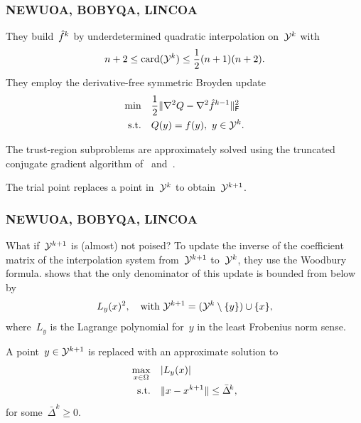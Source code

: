 \documentclass{polyu-presentation}
\newcommand{\objm}[1][]{\hat{f}\ifthenelse{\equal{#1}{}}{}{^{#1}}}
\newcommand{\xpt}[1][]{\mathcal{Y}\ifthenelse{\equal{#1}{}}{}{^{#1}}}
\begin{document}
\begin{frame}
    \frametitle{NEWUOA, BOBYQA, LINCOA~\parencite{Powell_2006,Powell_2009,Powell_2015}}

	They build~$\objm[k]$ by \alert{underdetermined quadratic interpolation} on~$\xpt[k]$ with
    \begin{equation*}
        n + 2 \le \card(\xpt[k]) \le \frac{1}{2} (n + 1) (n + 2).
    \end{equation*}
    They employ the \alert{derivative-free symmetric Broyden update}
    \begin{align*}
        \min        & \quad \frac{1}{2} \norm{\nabla^2 Q - \nabla^2 \objm[k - 1]}_{\mathsf{F}}^2\\
        \text{s.t.} & \quad Q(y) = f(y), ~ y \in \xpt[k].
    \end{align*}

    \begin{block}{}
        The \alert{trust-region subproblems} are approximately solved using the \alert{truncated conjugate gradient} algorithm of~\cite{Steihaug_1983} and~\cite{Toint_1981}.
    \end{block}

    \medskip

    The trial point \alert{replaces} a point in~$\xpt[k]$ to obtain~$\xpt[k + 1]$.
\end{frame}

\begin{frame}
    \frametitle{NEWUOA, BOBYQA, LINCOA~\parencite{Powell_2006,Powell_2009,Powell_2015}}

    \begin{block}{What if~$\xpt[k + 1]$ is (almost) not poised?}
        To update the \alert{inverse} of the coefficient matrix of the interpolation system from~$\xpt[k + 1]$ to~$\xpt[k]$, they use the \alert{Woodbury formula}.
        \cite{Powell_2004c} shows that the only denominator of this update is bounded from below by
        \begin{equation*}
            L_y(x)^2, \quad \text{with~$\xpt[k + 1] = (\xpt[k] \setminus \set{y}) \cup \set{x}$},
        \end{equation*}
        where~$L_y$ is the \alert{Lagrange polynomial} for~$y$ in the least Frobenius norm sense.
    \end{block}

    \smallskip

    A point~$y \in \xpt[k + 1]$ is \alert{replaced} with an approximate solution to
    \begin{align*}
        \max_{x \in \Omega} & \quad \lvert L_y(x)\rvert\\
        \text{s.t.}         & \quad \lVert x - x^{k + 1}\rVert \le \bar{\Delta}^{\! k},
    \end{align*}
    for some~$\bar{\Delta}^{\! k} \ge 0$.
\end{frame}
\end{document}
